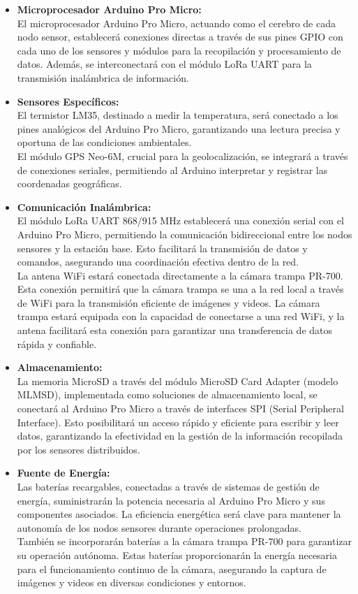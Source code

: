\begin{itemize}
\item \textbf{Microprocesador Arduino Pro Micro:}
\\El microprocesador Arduino Pro Micro, actuando como el cerebro de cada nodo sensor, establecerá conexiones directas a través de sus pines GPIO con cada uno de los sensores y módulos para la recopilación y procesamiento de datos. Además, se interconectará con el módulo LoRa UART para la transmisión inalámbrica de información.
\item \textbf{Sensores Específicos:}
\\El termistor LM35, destinado a medir la temperatura, será conectado a los pines analógicos del Arduino Pro Micro, garantizando una lectura precisa y oportuna de las condiciones ambientales. 
\\El módulo GPS Neo-6M, crucial para la geolocalización, se integrará a través de conexiones seriales, permitiendo al Arduino interpretar y registrar las coordenadas geográficas. 
\item \textbf{Comunicación Inalámbrica:}
\\El módulo LoRa UART 868/915 MHz establecerá una conexión serial con el Arduino Pro Micro, permitiendo la comunicación bidireccional entre los nodos sensores y la estación base. Esto facilitará la transmisión de datos y comandos, asegurando una coordinación efectiva dentro de la red.
\\La antena WiFi estará conectada directamente a la cámara trampa PR-700. Esta conexión permitirá que la cámara trampa se una a la red local a través de WiFi para la transmisión eficiente de imágenes y videos. La cámara trampa estará equipada con la capacidad de conectarse a una red WiFi, y la antena facilitará esta conexión para garantizar una transferencia de datos rápida y confiable.
\item \textbf{Almacenamiento:}
\\La memoria MicroSD a través del módulo MicroSD Card Adapter (modelo MLMSD), implementada como soluciones de almacenamiento local, se conectará al Arduino Pro Micro a través de interfaces SPI (Serial Peripheral Interface). Esto posibilitará un acceso rápido y eficiente para escribir y leer datos, garantizando la efectividad en la gestión de la información recopilada por los sensores distribuidos.
\item \textbf{Fuente de Energía:}
\\Las baterías recargables, conectadas a través de sistemas de gestión de energía, suministrarán la potencia necesaria al Arduino Pro Micro y sus componentes asociados. La eficiencia energética será clave para mantener la autonomía de los nodos sensores durante operaciones prolongadas.
\\También se incorporarán baterías a la cámara trampa PR-700 para garantizar su operación autónoma. Estas baterías proporcionarán la energía necesaria para el funcionamiento continuo de la cámara, asegurando la captura de imágenes y videos en diversas condiciones y entornos.
\end{itemize}
